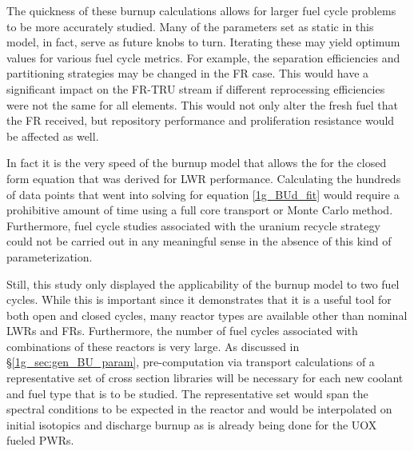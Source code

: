 The quickness of these burnup calculations allows for larger fuel cycle problems to be 
more accurately studied.  Many of the parameters set as static in this model, in fact, 
serve as future knobs to turn.  Iterating these may yield optimum values for various fuel 
cycle metrics.  For example, the separation efficiencies and partitioning strategies may be 
changed in the FR case.  This would have a significant impact on the FR-TRU stream if 
different reprocessing efficiencies were not the same for all elements.  This would not 
only alter the fresh fuel that the FR received, but repository performance and proliferation 
resistance would be affected as well.  

In fact it is the very speed of the burnup model that allows the for the closed form equation 
that was derived for LWR performance.  Calculating the hundreds of data points that went into 
solving for equation \ref{1g_BUd_fit} would require a prohibitive amount of time using a full 
core transport or Monte Carlo method.  Furthermore, fuel cycle studies associated with the 
uranium recycle strategy could not be carried out in any meaningful sense in the absence of 
this kind of parameterization.

Still, this study only displayed the applicability of the burnup model to two fuel cycles.  
While this is important since it demonstrates that it is a useful tool for both open and 
closed cycles, many reactor types are available other than nominal LWRs and FRs.  Furthermore, 
the number of fuel cycles associated with combinations of these reactors is very large.  
As discussed in \S \ref{1g_sec:gen_BU_param}, pre-computation via transport calculations of a 
representative set of cross section libraries will be necessary for each new coolant and fuel 
type that is to be studied.  The representative set would span the spectral conditions to be 
expected in the reactor and would be interpolated on initial isotopics and discharge burnup 
as is already being done for the UOX fueled PWRs.

